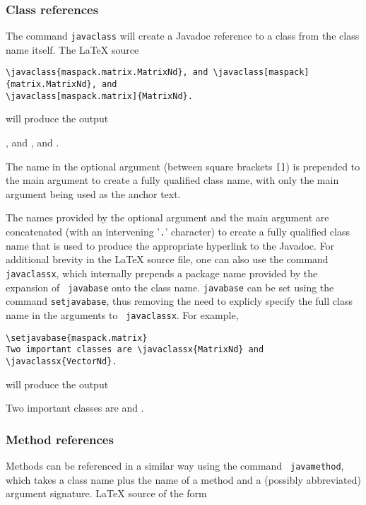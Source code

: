 \documentclass{article}
\begin{document}
\subsubsection{Class references}
\label{ClassRefsSec}

The command {\tt \BKS javaclass} will create a Javadoc reference to 
a class from the class name itself. The LaTeX source

\begin{lstlisting}[]
\javaclass{maspack.matrix.MatrixNd}, and \javaclass[maspack]{matrix.MatrixNd}, and
\javaclass[maspack.matrix]{MatrixNd}.
\end{lstlisting}

will produce the output

, and , and
.

The name in the optional argument (between square brackets {\tt []})
is prepended to the main argument to create a fully qualified class name,
with only the main argument being used as the anchor text. 

The names provided by the optional argument and the main argument are
concatenated (with an intervening '{\tt .}' character) to create a
fully qualified class name that is used to produce the appropriate
hyperlink to the Javadoc. For additional brevity in the LaTeX source
file, one can also use the command {\tt \BKS javaclassx}, which
internally prepends a package name provided by the expansion of {\tt
\BKS javabase} onto the class name. {\tt \BKS javabase} can be set
using the command {\tt \BKS setjavabase}, thus removing the need to
explicly specify the full class name in the arguments to {\tt \BKS
javaclassx}. For example,

\begin{lstlisting}[]
\setjavabase{maspack.matrix}
Two important classes are \javaclassx{MatrixNd} and \javaclassx{VectorNd}.
\end{lstlisting}

will produce the output

Two important classes are  and .

\subsubsection{Method references}

Methods can be referenced in a similar way using the command {\tt
\BKS javamethod}, which takes a class name plus the name of a method and
a (possibly abbreviated) argument signature.
LaTeX source of the form
\end{document}
